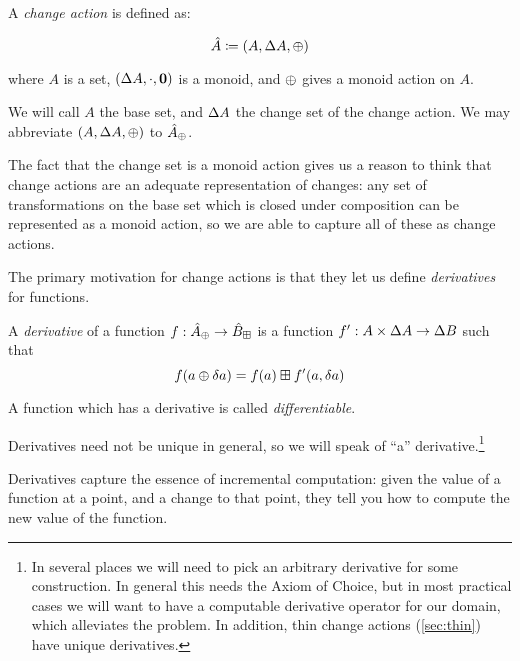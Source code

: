 \begin{defn}
  A \emph{change action} is defined as:

  \begin{displaymath}
    \hat{A} \coloneqq (A,\Delta A,\oplus)
  \end{displaymath}

  where $A$ is a set, $(\Delta A, \cdot, \textbf{0})$ is a monoid, and $\oplus$ gives a monoid action on $A$.

  We will call $A$ the base set, and $\Delta A$ the change set of the change
  action. We may abbreviate $(A,\Delta A,\oplus)$ to $\hat{A}_\oplus$.
\end{defn}

The fact that the change set is a monoid action gives us a reason to think that
change actions are an adequate representation of changes: any set of
transformations on the base set which is closed under composition can be
represented as a monoid action, so we are able to capture all of these as change actions.

The primary motivation for change actions is that they let us define
\emph{derivatives} for functions.

\begin{defn}[Derivatives]
  A \emph{derivative} of a function $f: \hat{A}_\oplus \rightarrow \hat{B}_\boxplus$ is a function $f': A \times \Delta A \rightarrow
  \Delta B$ such that
  \begin{displaymath}
    f(a \oplus \delta a) = f(a) \boxplus f'(a, \delta a)
  \end{displaymath}

  A function which has a derivative is called \emph{differentiable}.
\end{defn}

Derivatives need not be unique in general, so we will speak of ``a''
derivative.\footnote{In several places we will need to pick an arbitrary
  derivative for some construction. In general this needs the Axiom of Choice,
  but in most practical cases we will want to have a computable derivative
  operator for our domain, which alleviates the problem. In addition, thin
  change actions (\cref{sec:thin}) have unique derivatives.}

Derivatives capture the essence of incremental computation: given the value of a
function at a point, and a change to that point, they tell you how to compute
the new value of the function.

